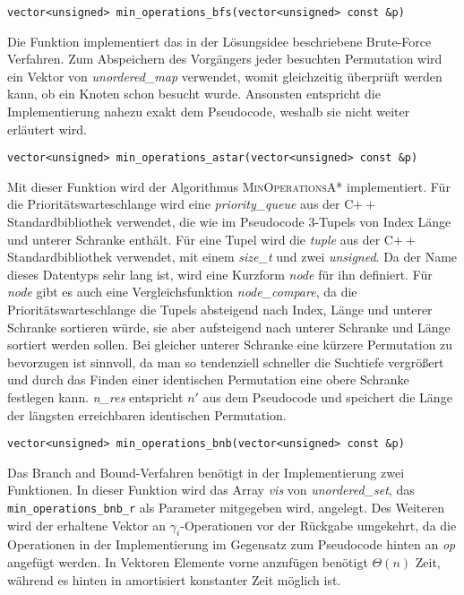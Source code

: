 \documentclass[a4paper, 10pt, ngerman]{article}
\begin{document}
\noindent \verb|vector<unsigned> min_operations_bfs(vector<unsigned> const &p)|
\smallskip

\noindent Die Funktion implementiert das in der Lösungsidee beschriebene Brute-Force Verfahren. Zum Abspeichern des Vorgängers jeder besuchten Permutation wird ein Vektor von \emph{unordered\_map} verwendet, womit gleichzeitig überprüft werden kann, ob ein Knoten schon besucht wurde. Ansonsten entspricht die Implementierung nahezu exakt dem Pseudocode, weshalb sie nicht weiter erläutert wird.
\bigskip

\noindent \verb|vector<unsigned> min_operations_astar(vector<unsigned> const &p)|
\smallskip

\noindent Mit dieser Funktion wird der Algorithmus \textsc{MinOperationsA*} implementiert. Für die Prioritätswarteschlange wird eine \emph{priority\_queue} aus der C$++$ Standardbibliothek verwendet, die wie im Pseudocode 3-Tupels von Index Länge und unterer Schranke enthält. Für eine Tupel wird die \emph{tuple} aus der C$++$ Standardbibliothek verwendet, mit einem \emph{size\_t} und zwei \emph{unsigned}. Da der Name dieses Datentyps sehr lang ist, wird eine Kurzform \emph{node} für ihn definiert. Für \emph{node} gibt es auch eine Vergleichsfunktion \emph{node\_compare}, da die Prioritätswarteschlange die Tupels absteigend nach Index, Länge und unterer Schranke sortieren würde, sie aber aufsteigend nach unterer Schranke und Länge sortiert werden sollen. Bei gleicher unterer Schranke eine kürzere Permutation zu bevorzugen ist sinnvoll, da man so tendenziell schneller die Suchtiefe vergrößert und durch das Finden einer identischen Permutation eine obere Schranke festlegen kann. \emph{n\_res} entspricht $n'$ aus dem Pseudocode und speichert die Länge der längsten erreichbaren identischen Permutation.
\bigskip

\noindent \verb|vector<unsigned> min_operations_bnb(vector<unsigned> const &p)|
\smallskip

\noindent Das Branch and Bound-Verfahren benötigt in der Implementierung zwei Funktionen. In dieser Funktion wird das Array \emph{vis} von \emph{unordered\_set}, das \verb|min_operations_bnb_r| als Parameter mitgegeben wird, angelegt. Des Weiteren wird der erhaltene Vektor an $\gamma_i$-Operationen vor der Rückgabe umgekehrt, da die Operationen in der Implementierung im Gegensatz zum Pseudocode hinten an \emph{op} angefügt werden. In Vektoren Elemente vorne anzufügen benötigt $\Theta(n)$ Zeit, während es hinten in amortisiert konstanter Zeit möglich ist.
\bigskip
\end{document}
